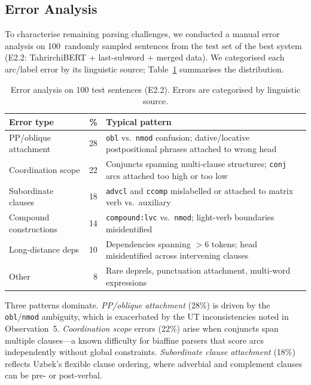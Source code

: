 \documentclass[runningheads]{llncs}
\begin{document}
\subsection{Error Analysis}
\label{sec:error_analysis}

To characterise remaining parsing challenges, we conducted a manual error analysis on 100~randomly sampled sentences from the test set of the best system (E2.2: TahrirchiBERT + last-subword + merged data).
We categorised each arc/label error by its linguistic source; Table~\ref{tab:error_analysis} summarises the distribution.

\begin{table}[t]
\centering
\small
\caption{Error analysis on 100 test sentences (E2.2). Errors are categorised by linguistic source.}
\label{tab:error_analysis}
\begin{tabular}{lrp{5.5cm}}
\toprule
\textbf{Error type} & \textbf{\%} & \textbf{Typical pattern} \\
\midrule
PP/oblique attachment  & 28 & \texttt{obl} vs.\ \texttt{nmod} confusion; dative/locative postpositional phrases attached to wrong head \\
Coordination scope     & 22 & Conjuncts spanning multi-clause structures; \texttt{conj} arcs attached too high or too low \\
Subordinate clauses    & 18 & \texttt{advcl} and \texttt{ccomp} mislabelled or attached to matrix verb vs.\ auxiliary \\
Compound constructions & 14 & \texttt{compound:lvc} vs.\ \texttt{nmod}; light-verb boundaries misidentified \\
Long-distance deps     & 10 & Dependencies spanning $>$6 tokens; head misidentified across intervening clauses \\
Other                  &  8 & Rare deprels, punctuation attachment, multi-word expressions \\
\bottomrule
\end{tabular}
\end{table}

Three patterns dominate.
\emph{PP/oblique attachment} (28\%) is driven by the \texttt{obl}/\texttt{nmod} ambiguity, which is exacerbated by the UT inconsistencies noted in Observation~5.
\emph{Coordination scope} errors (22\%) arise when conjuncts span multiple clauses---a known difficulty for biaffine parsers that score arcs independently without global constraints.
\emph{Subordinate clause attachment} (18\%) reflects Uzbek's flexible clause ordering, where adverbial and complement clauses can be pre- or post-verbal.
\end{document}
